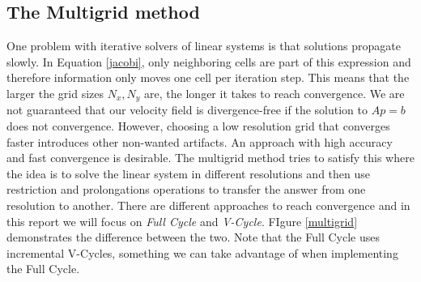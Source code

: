 \subsection{The Multigrid method}

One problem with iterative solvers of linear systems is that solutions propagate slowly. In Equation \ref{jacobi}, only neighboring cells are part of this expression and therefore information only moves one cell per iteration step. This means that the larger the grid sizes $N_x, N_y$ are, the longer it takes to reach convergence. We are not guaranteed that our velocity field is divergence-free if the solution to $Ap=b$ does not convergence. However, choosing a low resolution grid that converges faster introduces other non-wanted artifacts. An approach with high accuracy and fast convergence is desirable. The multigrid method tries to satisfy this where the idea is to solve the linear system in different resolutions and then use restriction and prolongations operations to transfer the answer from one resolution to another. There are different approaches to reach convergence and in this report we will focus on \emph{Full Cycle} and \emph{V-Cycle}. FIgure \ref{multigrid} demonstrates the difference between the two. Note that the Full Cycle uses incremental V-Cycles, something we can take advantage of when implementing the Full Cycle.

